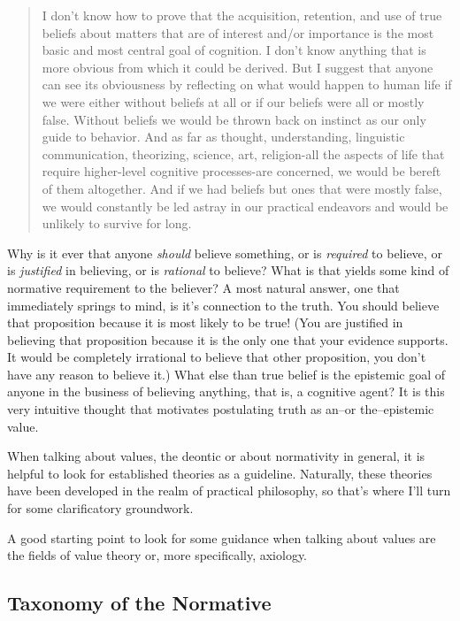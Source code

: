 \documentclass[12pt,numbers=noenddot]{scrartcl}
\begin{document}
\begin{quote}
I don't know how to prove that the acquisition, retention, and use of true beliefs about matters that are of interest and/or importance is the most basic and most central goal of cognition. I don't know anything that is more obvious from which it could be derived. But I suggest that anyone can see its obviousness by reflecting on what would happen to human life if we were either without beliefs at all or if our beliefs were all or mostly false. Without beliefs we would be thrown back on instinct as our only guide to behavior. And as far as thought, understanding, linguistic communication, theorizing, science, art, religion-all the aspects of life that require higher-level cognitive processes-are concerned, we would be bereft of them altogether. And if we had beliefs but ones that were mostly false, we would constantly be led astray in our practical endeavors and would be unlikely to survive for long. \textcite[30]{Alston2005-ALSBJD}
\end{quote}

Why is it ever that anyone \emph{should} believe something, or is \emph{required} to believe, or is \emph{justified} in believing, or is \emph{rational} to believe? What is that yields some kind of normative requirement to the believer? A most natural answer, one that immediately springs to mind, is it's connection to the truth. You should believe that proposition because it is most likely to be true! (You are justified in believing that proposition because it is the only one that your evidence supports. It would be completely irrational to believe that other proposition, you don't have any reason to believe it.) What else than true belief is the epistemic goal of anyone in the business of believing anything, that is, a cognitive agent? It is this very intuitive thought that motivates postulating truth as an–or the–epistemic value.

When talking about values, the deontic or about normativity in general, it is helpful to look for established theories as a guideline. Naturally, these theories have been developed in the realm of practical philosophy, so that's where I'll turn for some clarificatory groundwork.

A good starting point to look for some guidance when talking about values are the fields of value theory or, more specifically, axiology.

\subsection{ Taxonomy of the Normative}
\end{document}
